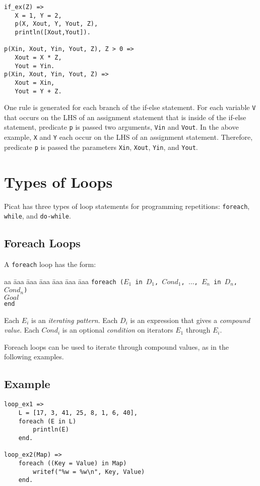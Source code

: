 \begin{verbatim}
if_ex(Z) => 
   X = 1, Y = 2, 
   p(X, Xout, Y, Yout, Z),
   println([Xout,Yout]).

p(Xin, Xout, Yin, Yout, Z), Z > 0 =>
   Xout = X * Z,
   Yout = Yin.
p(Xin, Xout, Yin, Yout, Z) =>
   Xout = Xin,
   Yout = Y + Z.
\end{verbatim}
One rule is generated for each branch of the if-else statement.  For each variable \texttt{V} that occurs on the LHS of an assignment statement that is inside of the if-else statement, predicate \texttt{p} is passed two arguments, \texttt{Vin} and \texttt{Vout}.  In the above example, \texttt{X} and \texttt{Y} each occur on the LHS of an assignment statement.  Therefore, predicate \texttt{p} is passed the parameters \texttt{Xin}, \texttt{Xout}, \texttt{Yin}, and \texttt{Yout}. 

\section{Types of Loops}
Picat has three types of loop statements for programming repetitions: \texttt{foreach}, \texttt{while}, and \texttt{do-while}.

\subsection{Foreach Loops}
A \texttt{foreach} loop has the form:
\begin{tabbing}
aa \= aaa \= aaa \= aaa \= aaa \= aaa \= aaa \kill
\> \texttt{foreach ($E_1$ in $D_1$, $Cond_1$, $\ldots$, $E_n$ in $D_n$, $Cond_n$)}  \\
\> \> $Goal$ \\
\>  \texttt{end} 
\end{tabbing}
Each $E_i$ is an \emph{iterating pattern}.  Each $D_i$ is an expression that gives a \emph{compound value}.  Each $Cond_i$ is an optional \emph{condition} on iterators $E_1$ through $E_i$. 

Foreach loops can be used to iterate through compound values, as in the following examples.

\subsection*{Example}
\begin{verbatim}
loop_ex1 =>
    L = [17, 3, 41, 25, 8, 1, 6, 40],
    foreach (E in L)
        println(E)
    end.

loop_ex2(Map) =>
    foreach ((Key = Value) in Map)
        writef("%w = %w\n", Key, Value)
    end.
\end{verbatim}

